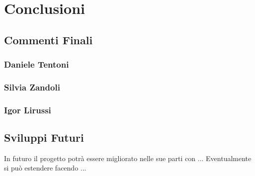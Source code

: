 
\chapter{Conclusioni}
    \section{Commenti Finali}
        \subsection{Daniele Tentoni}
        \subsection{Silvia Zandoli}
        \subsection{Igor Lirussi}
    \section{Sviluppi Futuri}
    In futuro il progetto potrà essere migliorato nelle sue parti con ...
    Eventualmente si può estendere facendo ...
